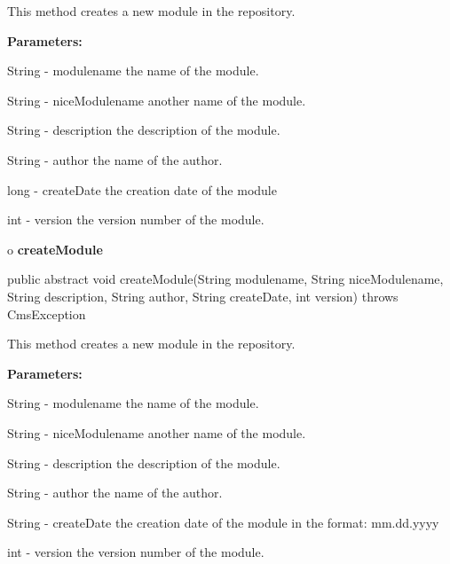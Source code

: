 \begin{description}
\htmlDD This method creates a new module in the repository. 

\begin{description}
\item {\bf Parameters:}  

String - modulename the name of the module.  

String - niceModulename another name of the module.  

String - description the description of the module.  

String - author the name of the author.  

long - createDate the creation date of the module  

int - version the version number of the module.  
\end{description}

\end{description}

o {\bf createModule} 

\begin{PRE}
 public abstract void createModule(String modulename,
                                   String niceModulename,
                                   String description,
                                   String author,
                                   String createDate,
                                   int version) throws CmsException
\end{PRE}

\begin{description}
\htmlDD This method creates a new module in the repository. 

\begin{description}
\item {\bf Parameters:}  

String - modulename the name of the module.  

String - niceModulename another name of the module.  

String - description the description of the module.  

String - author the name of the author.  

String - createDate the creation date of the module in the format: mm.dd.yyyy 


int - version the version number of the module.  
\end{description}

\end{description}

